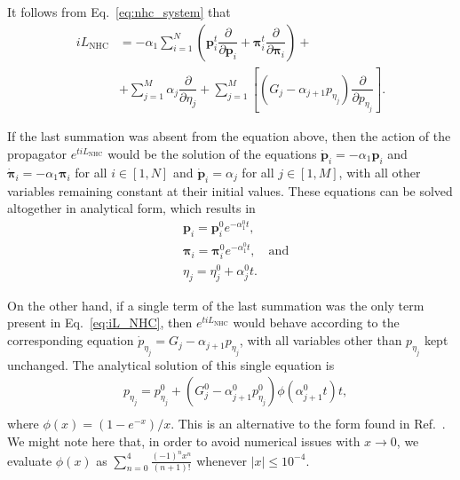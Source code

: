 \documentclass[aip,jcp,reprint,amsmath,amssymb,raggedbottom]{revtex4-1}
\newcommand{\vt}[1]{\boldsymbol{\mathbf{#1}}}           %
\newcommand{\tr}[1]{#1^t}                               %
\newcommand{\diff}[2]{\dfrac{\partial #1}{\partial #2}} %
\begin{document}
It follows from Eq.~\ref{eq:nhc_system} that
\begin{equation}
\label{eq:iL_NHC}
\begin{split}
i\!L_\text{NHC} &= -\alpha_1 \sum_{i=1}^N \left( \tr{\vt p}_i \diff{}{\vt p_i} + \tr{\vt \pi}_i \diff{}{\vt \pi_i}\right) + \\
&+ \sum_{j=1}^M \alpha_j \diff{}{\eta_j} + \sum_{j=1}^M \left[ (G_j - \alpha_{j+1} p_{\eta_j}) \diff{}{p_{\eta_j}} \right].
\end{split}
\end{equation}

If the last summation was absent from the equation above, then the action of the propagator $e^{t i\!L_\text{NHC}}$ would be the solution of the equations $\dot{\vt p}_i = -\alpha_1 \vt p_i$ and $\dot{\vt \pi}_i = -\alpha_1 \vt \pi_i$ for all $i \in [1,N]$ and $\dot{\vt p}_i = \alpha_j$ for all $j \in [1,M]$, with all other variables remaining constant at their initial values. These equations can be solved altogether in analytical form, which results in
\begin{subequations}
\begin{align}
&\vt p_i = \vt p_i^0 e^{-\alpha_1^0 t}, \\
&\vt \pi_i = \vt \pi_i^0 e^{-\alpha_1^0 t}, \quad \text{and}\\
&\eta_j = \eta_j^0 + \alpha_j^0 t.
\end{align}
\end{subequations}

On the other hand, if a single term of the last summation was the only term present in Eq.~\ref{eq:iL_NHC}, then $e^{t i\!L_\text{NHC}}$ would behave according to the corresponding equation $\dot{p}_{\eta_j} = G_j - \alpha_{j+1} p_{\eta_j}$, with all variables other than $p_{\eta_j}$ kept unchanged. The analytical solution of this single equation is
\begin{equation}
\label{eq:p_eta}
\begin{split}
&p_{\eta_j} = p_{\eta_j}^0 + \left( G_j^0 - \alpha_{j+1}^0 p_{\eta_j}^0 \right) \phi\left(\alpha_{j+1}^0 t\right) t, \\
\end{split}
\end{equation}
where $\phi(x) = (1-e^{-x})/x$. This is an alternative to the form found in Ref.~. We might note here that, in order to avoid numerical issues with $x \rightarrow 0$, we evaluate $\phi(x)$ as $\sum_{n=0}^4 \frac{(-1)^n x^n}{(n+1)!}$ whenever  $|x| \leq 10^{-4}$.
\end{document}
